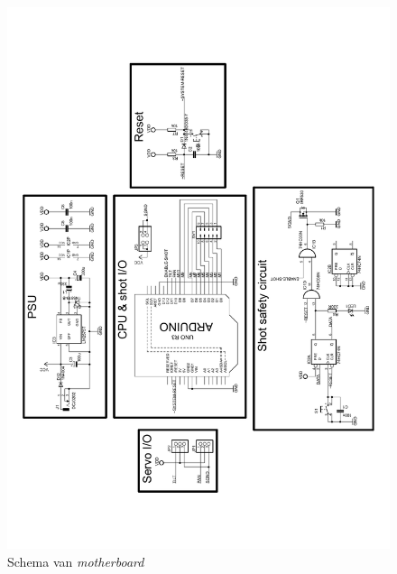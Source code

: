 \begin{figure}
    \includegraphics[scale=0.5]{figures/motherboard_schematic.pdf}
    \caption{Schema van \emph{motherboard}}
\end{figure}
